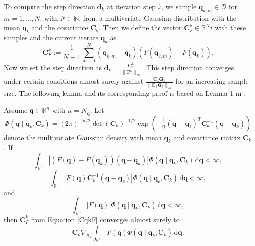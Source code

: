 To compute the step direction $\mathbf{d}_k$ at iteration step $k$, we sample $\mathbf{q}_{k,m}\in\mathcal{D}$ for $m=1,\dotsc,N$, with $N\in\mathbb{N}$, from a multivariate Gaussian distribution with the mean $\mathbf{q}_k$ and the covariance $\mathbf{C}_k$. Then we define the vector $\mathbf{C}_F^k\in\mathbb{R}^{N_\mathbf{q}}$ with these samples and the current iterate $\mathbf{q}_k$ as
\begin{equation}
\label{CqkF}
\mathbf{C}_F^k:=\frac{1}{N-1}\sum_{m=1}^N(\mathbf{q}_{k,m}-\mathbf{q}_k)(F(\mathbf{q}_{k,m})-F(\mathbf{q}_k)).
\end{equation}
Now we set the step direction as $\mathbf{d}_k=\frac{\mathbf{C}_F^k}{\|\mathbf{C}_F^k\|_\infty}$. This step direction converges under certain conditions almost surely against $\frac{\mathbf{C}_k\mathbf{G}_k}{\|\mathbf{C}_k\mathbf{G}_k\|_\infty}$ for an increasing sample size. The following lemma and its corresponding proof is based on Lemma 1 in \cite{Stordal2016-cj}.
\begin{lem}
Assume $\mathbf{q}\in\mathbb{R}^n$ with $n=N_\mathbf{q}$. Let
\begin{equation*}
\Phi(\mathbf{q}\mid \mathbf{q}_k, \mathbf{C}_k)=(2\pi)^{-n/2}\operatorname{det}(\mathbf{C}_k)^{-1/2}\operatorname{exp}\left(-\frac{1}{2}(\mathbf{q}-\mathbf{q}_k)^T\mathbf{C}^{-1}_k(\mathbf{q}-\mathbf{q}_k)\right)
\end{equation*}
denote the multivariate Gaussian density with mean $\mathbf{q}_k$ and covariance matrix $\mathbf{C}_k$. If
\begin{equation}
\label{lemmaCFKCondition}
\int_{\mathbb{R}^n}\left|(F(\mathbf{q})-F(\mathbf{q}_k))(\mathbf{q}-\mathbf{q}_k)\right|\Phi(\mathbf{q}\mid \mathbf{q}_k, \mathbf{C}_k)\,\mathrm{d}\mathbf{q}<\infty,
\end{equation}
\begin{equation}
\label{lemmaCFKCondition2}
\int_{\mathbb{R}^n}|F(\mathbf{q})\mathbf{C}^{-1}_k(\mathbf{q}-\mathbf{q}_k)|\Phi(\mathbf{q}\mid \mathbf{q}_k, \mathbf{C}_k)\,\mathrm{d}\mathbf{q}<\infty,
\end{equation}
and
\begin{equation}
\label{lemmaCFKCondition3}
\int_{\mathbb{R}^n}|F(\mathbf{q})|\Phi(\mathbf{q}\mid \mathbf{q}_k, \mathbf{C}_k)\,\mathrm{d}\mathbf{q}<\infty,
\end{equation}
then $\mathbf{C}_F^k$ from Equation \eqref{CqkF} converges almost surely to
\begin{equation*}
\mathbf{C}_k\nabla_{\mathbf{q}_k}\int_{\mathbb{R}^n}F(\mathbf{q})\Phi(\mathbf{q}\mid \mathbf{q}_k, \mathbf{C}_k)\,\mathrm{d}\mathbf{q}.
\end{equation*}
\end{lem}
